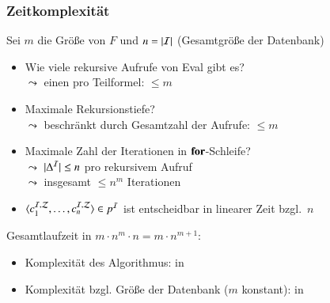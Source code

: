 \documentclass[onlymath]{beamer}
\begin{document}
\begin{frame}\frametitle{Zeitkomplexität}

Sei $m$ die Größe von $F$ und $n=|\mathcal{I}|$ (Gesamtgröße der Datenbank)
\bigskip

\begin{itemize}
\item Wie viele rekursive Aufrufe von Eval gibt es?\\\pause
$\leadsto$ einen pro Teilformel: $\leq m$
%
\item Maximale Rekursionstiefe?\\\pause
$\leadsto$ beschränkt durch Gesamtzahl der Aufrufe: $\leq m$
%
\item Maximale Zahl der Iterationen in $\textbf{for}$-Schleife?\\\pause
$\leadsto$ $|\Delta^{\mathcal{I}}|\leq n$ pro rekursivem Aufruf\\
$\leadsto$ insgesamt $\leq n^m$ Iterationen
%
\item $\langle{c_1^{\mathcal{I},\mathcal{Z}},\ldots,c_n^{\mathcal{I},\mathcal{Z}}}\rangle\in p^{\mathcal{I}}$ ist entscheidbar in linearer Zeit bzgl.\ $n$
\end{itemize}
\bigskip\pause

Gesamtlaufzeit in $m\cdot n^m\cdot n=m\cdot n^{m+1}$:
\begin{itemize}
\item Komplexität des Algorithmus: in \ExpTime
\item Komplexität bzgl. Größe der Datenbank ($m$ konstant): in \PTime
\end{itemize}

\end{frame}
\end{document}
